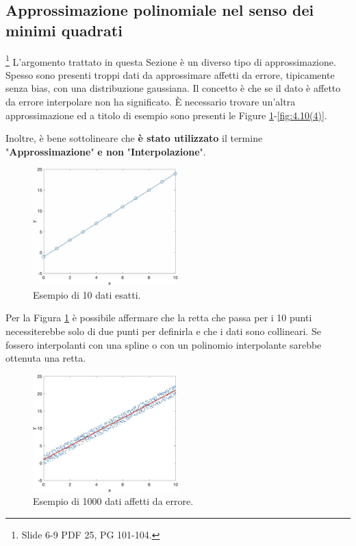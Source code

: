 \subsection{Approssimazione polinomiale nel senso dei minimi quadrati}\label{ssec:approxPolMinQuad}
\footnote{Slide 6-9 PDF 25, PG 101-104.} L'argomento trattato in questa Sezione è un diverso tipo di approssimazione. Spesso sono presenti troppi dati da approssimare affetti da errore, tipicamente senza bias, con una distribuzione gaussiana. Il concetto è che se il dato è affetto da errore interpolare non ha significato. È necessario trovare un'altra approssimazione ed a titolo di esempio sono presenti le Figure \ref{fig:4.10(1)}-\ref{fig:4.10(4)}.

Inoltre, è bene sottolineare che \textbf{è stato utilizzato} il termine "\textbf{Approssimazione}" \textbf{e non} "\textbf{Interpolazione}".

\begin{figure}
    \centering
    \includegraphics[width=0.5\textwidth]{immagini/4.10(1).jpg}
    \caption{Esempio di 10 dati esatti.}
    \label{fig:4.10(1)}
\end{figure}

Per la Figura \ref{fig:4.10(1)} è possibile affermare che la retta che passa per i 10 punti necessiterebbe solo di due punti per definirla e che i dati sono collineari. Se fossero interpolanti con una spline o con un polinomio interpolante sarebbe ottenuta una retta.

\begin{figure}
    \centering
    \includegraphics[width=0.5\textwidth]{immagini/4.10(2).png}
    \caption{Esempio di 1000 dati affetti da errore.}\label{fig:4.10(2)}
\end{figure}

